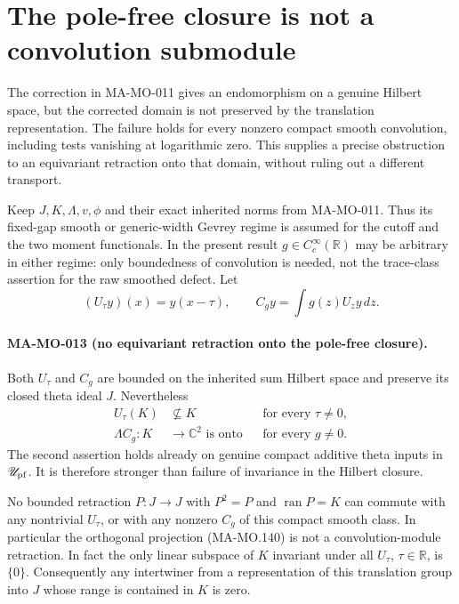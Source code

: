 \section{The pole-free closure is not a convolution submodule}
\label{sec:pole-free-module-obstruction}

The correction in MA-MO-011 gives an endomorphism on a genuine
Hilbert space, but the corrected domain is not preserved by the
translation representation. The failure holds for every nonzero
compact smooth convolution, including tests vanishing at logarithmic
zero. This supplies a precise obstruction to an equivariant
retraction onto that domain, without ruling out a different transport.

Keep \(J,K,\Lambda,v,\phi\) and their exact inherited norms
from MA-MO-011. Thus its fixed-gap smooth or generic-width Gevrey
regime is assumed for the cutoff and the two moment functionals.
In the present result \(g\in C_c^\infty(\mathbb R)\) may be
arbitrary in either regime: only boundedness of convolution is
needed, not the trace-class assertion for the raw smoothed defect.
Let
\[
 (U_\tau y)(x)=y(x-\tau),\qquad
 C_gy=\int g(z)U_zy\,dz.
 \tag{MA-MO.200}
\]

\paragraph{MA-MO-013 (no equivariant retraction onto the pole-free closure).}
Both \(U_\tau\) and \(C_g\) are bounded on the inherited
sum Hilbert space and preserve its closed theta ideal \(J\).
Nevertheless
\[
 \begin{aligned}
 U_\tau(K)&\not\subseteq K&&\text{for every }\tau\ne0,\\
 \Lambda C_g:K&\longrightarrow\mathbb C^2
     \text{ is onto}&&\text{for every }g\ne0.
 \end{aligned}
 \tag{MA-MO.201}
\]
The second assertion holds already on genuine compact additive
theta inputs in \(\mathscr U_{\rm pf}\). It is therefore
stronger than failure of invariance in the Hilbert closure.

No bounded retraction \(P:J\to J\) with
\(P^2=P\) and \(\operatorname{ran}P=K\) can commute with
any nontrivial \(U_\tau\), or with any nonzero \(C_g\)
of this compact smooth class. In particular the orthogonal
projection (MA-MO.140) is not a convolution-module retraction.
In fact the only linear subspace of \(K\) invariant under
all \(U_\tau\), \(\tau\in\mathbb R\), is \(\{0\}\).
Consequently any intertwiner from a representation of this
translation group into \(J\) whose range is contained in
\(K\) is zero.

